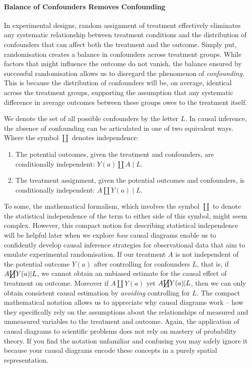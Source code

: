 \documentclass[
  singlecolumn]{article}
\let\oldparagraph\paragraph
\renewcommand{\paragraph}[1]{\oldparagraph{#1}\mbox{}}
\providecommand{\tightlist}{%
  \setlength{\itemsep}{0pt}\setlength{\parskip}{0pt}}\usepackage{longtable,booktabs,array}
\begin{document}
\paragraph{Balance of Confounders Removes
Confounding}\label{balance-of-confounders-removes-confounding}

In experimental designs, random assignment of treatment effectively
eliminates any systematic relationship between treatment conditions and
the distribution of confounders that can affect both the treatment and
the outcome. Simply put, randomisation creates a balance in confounders
across treatment groups. While factors that might influence the outcome
do not vanish, the balance ensured by successful randomisation allows us
to disregard the phenomenon of \emph{confounding}. This is because the
distribution of confounders will be, on average, identical across the
treatment groups, supporting the assumption that any systematic
difference in average outcomes between these groups owes to the
treatment itself.

We denote the set of all possible confounders by the letter \(L\). In
causal inference, the absence of confounding can be articulated in one
of two equivalent ways. Where the symbol \(\coprod\) denotes
independence:

\begin{enumerate}
\def\labelenumi{\arabic{enumi}.}
\tightlist
\item
  The potential outcomes, given the treatment and confounders, are
  conditionally independent: \(Y(a) \coprod A \mid L\).
\item
  The treatment assignment, given the potential outcomes and
  confounders, is conditionally independent: \(A \coprod Y(a) \mid L\).
\end{enumerate}

To some, the mathematical formalism, which involves the symbol
\(\coprod\) to denote the statistical independence of the term to either
side of this symbol, might seem complex. However, this compact notion
for describing statistical independence will be helpful later when we
explore \emph{how} causal diagrams enable us to confidently develop
causal inference strategies for observational data that aim to emulate
experimental randomisation. If our treatment \(A\) is not independent of
the potential outcome \(Y(a)\) after controlling for confounders \(L\),
that is, if \(A\cancel\coprod Y(a)|L\), we cannot obtain an unbiased
estimate for the causal effect of treatment on outcome. Moreover if
\(A\coprod Y(a)\) yet \(A\cancel \coprod Y(a)|L\), then we can only
obtain consistent causal estimation by \emph{avoiding} controlling for
\(L\). The compact mathematical notation allows us to appreciate why
causal diagrams work -- how they specifically rely on the assumptions
about the relationships of measured and unmeasured variables to the
treatment and outcome. Again, the application of causal diagrams to
scientific problems does not rely on mastery of probability theory. If
you find the notation unfamiliar and confusing you may safely ignore it
because your causal diagrams encode these concepts in a purely spatial
representation.
\end{document}
